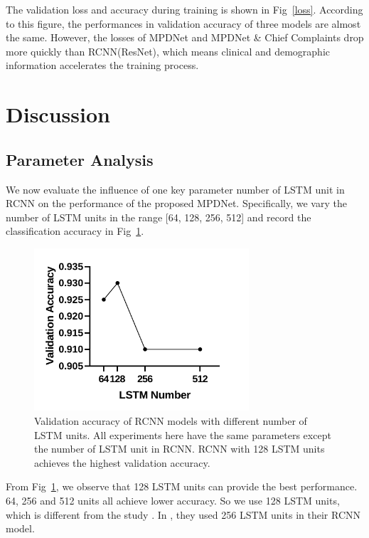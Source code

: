 \documentclass[journal]{IEEEtran}
\begin{document}
The validation loss and accuracy during training is shown in Fig~\ref{loss}. According to this figure, the performances in validation accuracy of three models are almost the same. However, the losses of MPDNet and MPDNet \& Chief Complaints drop more quickly than RCNN(ResNet), which means clinical and demographic information accelerates the training process.


\section{Discussion}
\label{discuss}

\subsection{Parameter Analysis}
We now evaluate the influence of one key parameter number of LSTM unit in RCNN on the performance of the proposed MPDNet. Specifically, we vary the number of LSTM units in the range [64, 128, 256, 512] and record the classification accuracy in Fig~\ref{LSTMNumber}.


\begin{figure}[htbp]
    \centerline{\includegraphics[width=80mm]{LSTMNumber.pdf}}
    \vspace{0cm}
    \caption{Validation accuracy of RCNN models with different number of LSTM units. All experiments here have the same parameters except the number of LSTM unit in RCNN. RCNN with 128 LSTM units achieves the highest validation accuracy.}
    \vspace{-0cm}
    \label{LSTMNumber}
    \end{figure}

From Fig~\ref{LSTMNumber}, we observe that 128 LSTM units can provide the best performance. 64, 256 and 512 units all achieve lower accuracy. So we use 128 LSTM units, which is different from the study \cite{Donahue2015Long}. In \cite{Donahue2015Long}, they used 256 LSTM units in their RCNN model.
\end{document}
